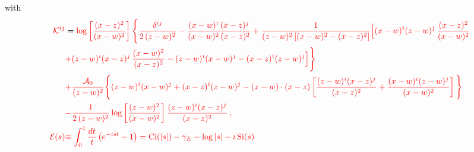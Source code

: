 \documentclass[9pt]{article}
\numberwithin{equation}{section}
\begin{document}
{\color{red}with}
\begin{align}
{\color{red}\mathcal{K}^{ij}} & = {\color{red}\log\left[\frac{(x-z)^{2}}{(x-w)^{2}}\right]\Bigg\{\frac{\delta^{ij}}{2\,(z-w)^{2}}-\frac{(x-w)^{i}\,(x-z)^{j}}{(x-w)^{2}\,(x-z)^{2}}+\frac{1}{(z-w)^{2}\left[(x-w)^{2}-(x-z)^{2}\right]}\Big[(x-w)^{i}(z-w)^{j}\,\frac{(x-z)^{2}}{(x-w)^{2}}}\notag \\
& {\color{red}+(z-w)^{i}(x-z)^{j}\,\frac{(x-w)^{2}}{(x-z)^{2}}-(z-w)^{i}(x-w)^{j}-(x-z)^{i}(z-w)^{j}\Big]\Bigg\}}\notag \\
& {\color{red}+\frac{\mathcal{A}_{0}}{(z-w)^{2}}\Bigg\{(z-w)^{i}(x-w)^{j}+(x-z)^{i}(z-w)^{j}-(x-w)\cdot(x-z)\left[\frac{(z-w)^{i}(x-z)^{j}}{(x-z)^{2}}+\frac{(x-w)^{i}(z-w)^{j}}{(x-w)^{2}}\right]\Bigg\}}\notag \\
& {\color{red}-\frac{1}{2\,(z-w)^{2}}\log\left[\frac{(z-w)^{2}}{(x-w)^{2}}\right]\frac{(z-w)^{i}(x-z)^{j}}{(x-z)^{2}}\,,}\notag \\
{\color{red}\mathcal{E}(s)} & {\color{red}\equiv\int_{0}^{1}\frac{dt}{t}\,\big(e^{-ist}-1\big)=\mathrm{Ci}(|s|)-\gamma_{E}-\log|s|-i\,\mathrm{Si}(s)}
\end{align}
\end{document}
